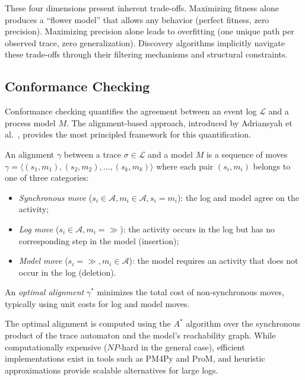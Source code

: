 These four dimensions present inherent trade-offs. Maximizing fitness
alone produces a ``flower model'' that allows any behavior (perfect
fitness, zero precision). Maximizing precision alone leads to overfitting
(one unique path per observed trace, zero generalization). Discovery
algorithms implicitly navigate these trade-offs through their filtering
mechanisms and structural constraints.


\subsection{Conformance Checking}
\label{sec:conformance-checking}

Conformance checking quantifies the agreement between an event log
$\mathcal{L}$ and a process model $M$. The alignment-based approach,
introduced by Adriansyah et al.~\cite{adriansyah2011alignments}, provides
the most principled framework for this quantification.

\begin{definition}[Alignment]
\label{def:alignment}
An alignment $\gamma$ between a trace $\sigma \in \mathcal{L}$ and a model
$M$ is a sequence of moves $\gamma = \langle (s_1, m_1), (s_2, m_2),
\ldots, (s_k, m_k) \rangle$ where each pair $(s_i, m_i)$ belongs to one
of three categories:
\begin{itemize}
    \item \emph{Synchronous move} ($s_i \in \mathcal{A}, m_i \in \mathcal{A},
    s_i = m_i$): the log and model agree on the activity;
    \item \emph{Log move} ($s_i \in \mathcal{A}, m_i = \gg$): the activity
    occurs in the log but has no corresponding step in the model (insertion);
    \item \emph{Model move} ($s_i = \gg, m_i \in \mathcal{A}$): the model
    requires an activity that does not occur in the log (deletion).
\end{itemize}
An \emph{optimal alignment} $\gamma^*$ minimizes the total cost of
non-synchronous moves, typically using unit costs for log and model moves.
\end{definition}

The optimal alignment is computed using the $A^*$ algorithm over the
synchronous product of the trace automaton and the model's reachability
graph. While computationally expensive ($NP$-hard in the general case),
efficient implementations exist in tools such as PM4Py and ProM, and
heuristic approximations provide scalable alternatives for large logs.


